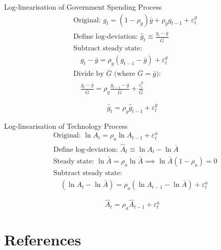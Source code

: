 \documentclass[11pt,preprint]{elsarticle}
\numberwithin{equation}{section}
\numberwithin{figure}{section}
\numberwithin{table}{section}
\begin{document}
Log-linearisation of Government Spending Process \begin{align*}
& \text{Original: } g_t = (1-\rho_g)\bar{g} + \rho_g g_{t-1} + \varepsilon_t^g \\[6pt]
& \text{Define log-deviation: } \hat{g}_t \equiv \frac{g_t - \bar{g}}{\bar{G}} \\[6pt]
& \text{Subtract steady state:} \\
& \quad g_t - \bar{g} = \rho_g (g_{t-1} - \bar{g}) + \varepsilon_t^g \\[6pt]
& \text{Divide by } \bar{G} \text{ (where } \bar{G} = \bar{g}): \\
& \quad \frac{g_t - \bar{g}}{\bar{G}} = \rho_g \frac{g_{t-1} - \bar{g}}{\bar{G}} + \frac{\varepsilon_t^g}{\bar{G}}
\end{align*}

\begin{equation}\label{gov_spending_linearised_app}
\boxed{\hat{g}_t = \rho_g \hat{g}_{t-1} + \varepsilon_t^g}
\end{equation}

Log-linearisation of Technology Process \begin{align*}
& \text{Original: } \ln A_t = \rho_a \ln A_{t-1} + \varepsilon_t^a \\[6pt]
& \text{Define log-deviation: } \hat{A}_t \equiv \ln A_t - \ln \bar{A} \\[6pt]
& \text{Steady state: } \ln \bar{A} = \rho_a \ln \bar{A} \implies \ln \bar{A}(1 - \rho_a) = 0 \\[6pt]
& \text{Subtract steady state:} \\
& \quad (\ln A_t - \ln \bar{A}) = \rho_a (\ln A_{t-1} - \ln \bar{A}) + \varepsilon_t^a 
\end{align*}

\begin{equation}\label{technology_process_linearised_app}
\boxed{\hat{A}_t = \rho_a \hat{A}_{t-1} + \varepsilon_t^a}
\end{equation}

\newpage

\endgroup

\section*{References}\label{references}
\end{document}
